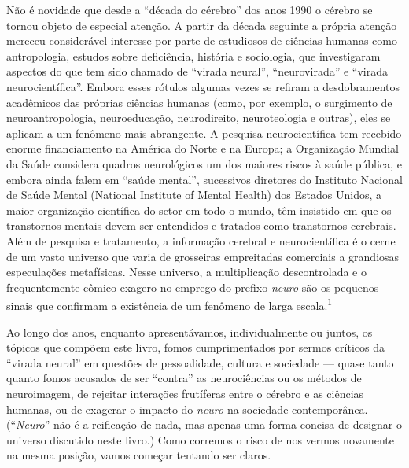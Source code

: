 Não é novidade que desde a ``década do cérebro'' dos anos 1990 o cérebro
se tornou objeto de especial atenção. A partir da década seguinte a
própria atenção mereceu considerável interesse por parte de estudiosos
de ciências humanas como antropologia, estudos sobre deficiência,
história e sociologia, que investigaram aspectos do que tem sido chamado
de ``virada neural'', ``neurovirada'' e ``virada neurocientífica''.
Embora esses rótulos algumas vezes se refiram a desdobramentos
acadêmicos das próprias ciências humanas (como, por exemplo, o
surgimento de neuroantropologia, neuroeducação, neurodireito,
neuroteologia e outras), eles se aplicam a um fenômeno mais abrangente.
A pesquisa neurocientífica tem recebido enorme financiamento na América
do Norte e na Europa; a Organização Mundial da Saúde considera quadros
neurológicos um dos maiores riscos à saúde pública, e embora ainda falem
em ``saúde mental'', sucessivos diretores do Instituto Nacional de Saúde
Mental (National Institute of Mental Health) dos Estados Unidos, a maior
organização científica do setor em todo o mundo, têm insistido em que os
transtornos mentais devem ser entendidos e tratados como transtornos
cerebrais. Além de pesquisa e tratamento, a informação cerebral e
neurocientífica é o cerne de um vasto universo que varia de grosseiras
empreitadas comerciais a grandiosas especulações metafísicas. Nesse
universo, a multiplicação descontrolada e o frequentemente cômico
exagero no emprego do prefixo \emph{neuro} são os pequenos sinais que
confirmam a existência de um fenômeno de larga
escala.\textsuperscript{1}

Ao longo dos anos, enquanto apresentávamos, individualmente ou juntos,
os tópicos que compõem este livro, fomos cumprimentados por sermos
críticos da ``virada neural'' em questões de pessoalidade, cultura e
sociedade --- quase tanto quanto fomos acusados de ser ``contra'' as
neurociências ou os métodos de neuroimagem, de rejeitar interações
frutíferas entre o cérebro e as ciências humanas, ou de exagerar o
impacto do \emph{neuro} na sociedade contemporânea. (``\emph{Neuro}''
não é a reificação de nada, mas apenas uma forma concisa de designar o
universo discutido neste livro.) Como corremos o risco de nos vermos
novamente na mesma posição, vamos começar tentando ser claros.

